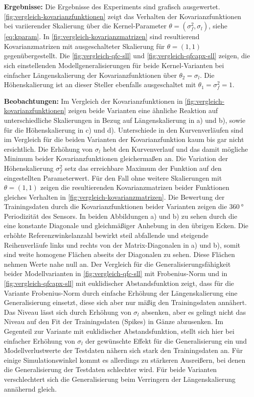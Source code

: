 \clearpage


\textbf{Ergebnisse:} Die Ergebnisse des Experiments sind grafisch ausgewertet. \autoref{fig:vergleich-kovarianzfunktionen} zeigt das Verhalten der Kovarianzfunktionen bei variierender Skalierung über die Kernel-Parameter $\theta = (\sigma_f^2, \sigma_l)$, siehe \autoref{eq:kparam}. In \autoref{fig:vergleich-kovarianzmatrizen} sind resultierend Kovarianzmatrizen mit ausgeschalteter Skalierung für $\theta = (1, 1)$ gegenübergestellt. Die \autoref{fig:vergleich-qfc-sll} und \autoref{fig:vergleich-qfcapx-sll} zeigen, die sich einstellenden Modellgeneralisierungen für beide Kernel-Varianten bei einfacher Längenskalierung der Kovarianzfunktionen über $\theta_2 = \sigma_l$. Die Höhenskalierung ist an dieser Steller ebenfalls ausgeschaltet mit $\theta_1 = \sigma_f^2 = 1$.

\textbf{Beobachtungen:} Im Vergleich der Kovarianzfunktionen in \autoref{fig:vergleich-kovarianzfunktionen} zeigen beide Varianten eine ähnliche Reaktion auf unterschiedliche Skalierungen in Bezug auf Längenskalierung in a) und b), sowie für die Höhenskalierung in c) und d). Unterschiede in den Kurvenverläufen sind im Vergleich für die beiden Varianten der Kovarianzfunktion kaum bis gar nicht ersichtlich. Die Erhöhung von $\sigma_l$ hebt den Kurvenverlauf und das damit mögliche Minimum beider Kovarianzfunktionen gleichermaßen an. Die Variation der Höhenskalierung $\sigma_f^2$ setz das erreichbare Maximum der Funktion auf den eingestellten Parameterwert.
Für den Fall ohne weitere Skalierungen mit $\theta = (1,1)$ zeigen die resultierenden Kovarianzmatrizen beider Funktionen gleiches Verhalten in \autoref{fig:vergleich-kovarianzmatrizen}. Die Bewertung der Trainingsdaten durch die Kovarianzfunktionen beider Varianten zeigen die $\SI{360}{\degree}$ Periodizität des Sensors. In beiden Abbildungen a) und b) zu sehen durch die eine konstante Diagonale und gleichmäßiger Anhebung in den übrigen Ecken. Die erhöhte Referenzwinkelanzahl bewirkt steil abfallende und steigende Reihenverläufe links und rechts von der Matrix-Diagonalen in a) und b), somit sind weite homogene Flächen abseits der Diagonalen zu sehen. Diese Flächen nehmen Werte nahe null an. Der Vergleich für die Generalisierungsfähigkeit beider Modellvarianten in \autoref{fig:vergleich-qfc-sll} mit Frobenius-Norm und in \autoref{fig:vergleich-qfcapx-sll} mit euklidischer Abstandsfunktion zeigt, dass für die Variante Frobenius-Norm durch einfache Erhöhung der Längenskalierung eine Generalisierung einsetzt, diese sich aber nur mäßig den Trainingsdaten annähert. Das Niveau lässt sich durch Erhöhung von $\sigma_l$ absenken, aber es gelingt nicht das Niveau auf den Fit der Trainingsdaten (Spikes) in Gänze abzusenken. Im Gegenteil zur Variante mit euklidischer Abstandsfunktion, stellt sich hier bei einfacher Erhöhung von $\sigma_l$ der gewünschte Effekt für die Generalisierung ein und Modellverlustwerte der Testdaten nähern sich stark den Trainingsdaten an. Für einige Simulationswinkel kommt es allerdings zu stärkeren Ausreißern, bei denen die Generalisierung der Testdaten schlechter wird. Für beide Varianten verschlechtert sich die Generalisierung beim Verringern der Längenskalierung annähernd gleich.


